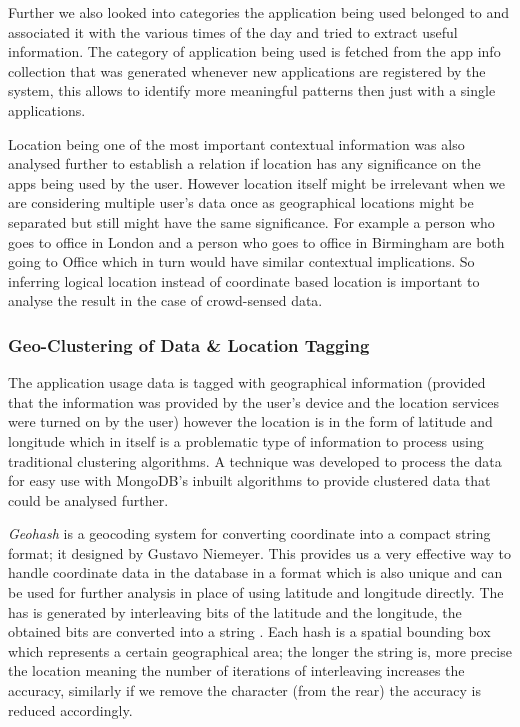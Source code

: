 \documentclass[prodmode,acmtecs]{acmsmall}
\begin{document}
Further we also looked into categories the application being used belonged to and associated it with the various times of the day and tried to extract useful information. The category of application being used is fetched from the app info collection that was generated whenever new applications are registered by the system, this allows to identify more meaningful patterns then just with a single applications.

Location being one of the most important contextual information was also analysed further to establish a relation if location has any significance on the apps being used by the user. However location itself might be irrelevant when we are considering multiple user's data once as geographical locations might be separated but still might have the same significance. For example a person who goes to office in London and a person who goes to office in Birmingham are both going to Office which in turn would have similar contextual implications. So inferring logical location instead of coordinate based location is important to analyse the result in the case of crowd-sensed data.

\subsubsection{Geo-Clustering of Data \& Location Tagging}
\label{geotagging}

The application usage data is tagged with geographical information (provided that the information was provided by the user's device and the location services were turned on by the user) however the location is in the form of latitude and longitude which in itself is a problematic type of information to process using traditional clustering algorithms. A technique was developed to process the data for easy use with MongoDB's inbuilt algorithms to provide clustered data that could be analysed further.

\textit{Geohash} is a geocoding system for converting coordinate into a compact string format; it designed by Gustavo Niemeyer. This provides us a very effective way to handle coordinate data in the database in a format which is also unique and can be used for further analysis in place of using latitude and longitude directly. The has is generated by interleaving bits of the latitude and the longitude, the obtained bits are converted into a string \cite{balkic2012geohash}. Each hash is a spatial bounding box which represents a certain geographical area; the longer the string is, more precise the location meaning the number of iterations of interleaving increases the accuracy, similarly if we remove the character (from the rear) the accuracy is reduced accordingly. 
\end{document}

